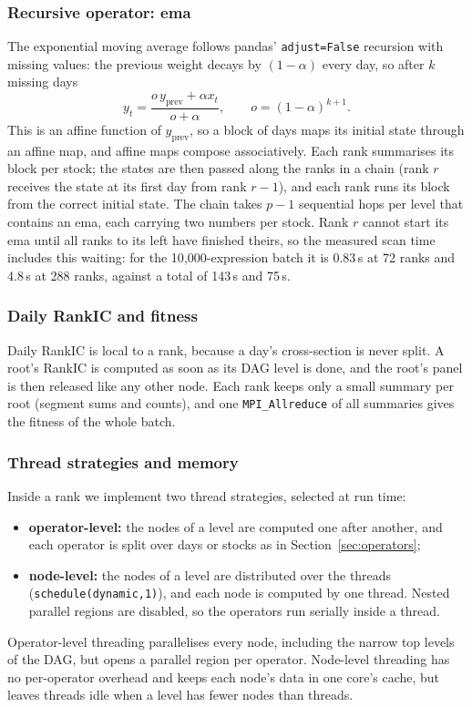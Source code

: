 \documentclass[11pt,a4paper]{article}
\newcommand{\code}[1]{\texttt{#1}}
\begin{document}
\subsubsection{Recursive operator: ema}
\label{sec:ema}
The exponential moving average follows pandas' \code{adjust=False} recursion with missing values: the previous weight decays by $(1-\alpha)$ every day, so after $k$ missing days
\begin{equation}
  y_t = \frac{o\,y_{\text{prev}} + \alpha x_t}{o+\alpha}, \qquad o = (1-\alpha)^{k+1}.
\end{equation}
This is an affine function of $y_{\text{prev}}$, so a block of days maps its initial state through an affine map, and affine maps compose associatively. Each rank summarises its block per stock; the states are then passed along the ranks in a chain (rank $r$ receives the state at its first day from rank $r-1$), and each rank runs its block from the correct initial state.
The chain takes $p-1$ sequential hops per level that contains an ema, each carrying two numbers per stock. Rank $r$ cannot start its ema until all ranks to its left have finished theirs, so the measured scan time includes this waiting: for the 10{,}000-expression batch it is 0.83\,s at 72 ranks and 4.8\,s at 288 ranks, against a total of 143\,s and 75\,s.

\subsubsection{Daily RankIC and fitness}
Daily RankIC is local to a rank, because a day's cross-section is never split. A root's RankIC is computed as soon as its DAG level is done, and the root's panel is then released like any other node. Each rank keeps only a small summary per root (segment sums and counts), and one \code{MPI\_Allreduce} of all summaries gives the fitness of the whole batch.

\subsubsection{Thread strategies and memory}
\label{sec:threads}
Inside a rank we implement two thread strategies, selected at run time:
\begin{itemize}[nosep]
  \item \textbf{operator-level:} the nodes of a level are computed one after another, and each operator is split over days or stocks as in Section~\ref{sec:operators};
  \item \textbf{node-level:} the nodes of a level are distributed over the threads (\code{schedule(dynamic,1)}), and each node is computed by one thread. Nested parallel regions are disabled, so the operators run serially inside a thread.
\end{itemize}
Operator-level threading parallelises every node, including the narrow top levels of the DAG, but opens a parallel region per operator. Node-level threading has no per-operator overhead and keeps each node's data in one core's cache, but leaves threads idle when a level has fewer nodes than threads.
\end{document}
